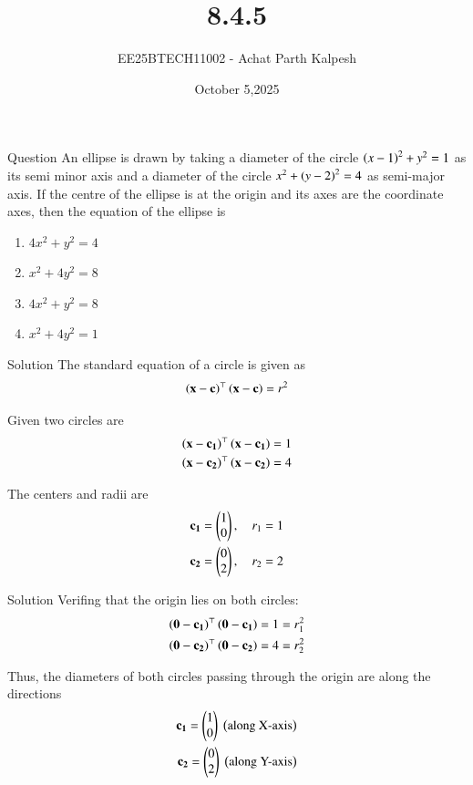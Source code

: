 \documentclass{beamer}
\title %
{8.4.5}
\date{October 5,2025}
\author %
{EE25BTECH11002 - Achat Parth Kalpesh}
\begin{document}
\frame{\titlepage}

\begin{frame}{Question}
An ellipse is drawn by taking a diameter of the circle $\left(x-1\right)^2+y^2=1$ as its semi minor axis and a diameter of the circle $x^2+\left(y-2\right)^2=4$ as semi-major axis. If the centre of the ellipse is at the origin and its axes are the coordinate axes, then the equation of the ellipse is 
\begin{multicols}{2}
\begin{enumerate}
    \item $4x^2+y^2=4$ 
    \item $x^2+4y^2=8$
    \item $4x^2+y^2=8$
    \item $x^2+4y^2=1$
\end{enumerate}
\end{multicols}
\end{frame}

\begin{frame}{Solution}
The standard equation of a circle is given as
\begin{align}
    \left(\mathbf{x}-\mathbf{c}\right)^\top\left(\mathbf{x}-\mathbf{c}\right) = r^2
\end{align}

Given two circles are
\begin{align}
    \left(\mathbf{x}-\mathbf{c_1}\right)^\top\left(\mathbf{x}-\mathbf{c_1}\right) = 1\\
    \left(\mathbf{x}-\mathbf{c_2}\right)^\top\left(\mathbf{x}-\mathbf{c_2}\right) = 4
\end{align}

The centers and radii are
\begin{align}
    \mathbf{c_1} = \begin{pmatrix}1\\0\end{pmatrix}, \quad r_1 = 1\\
    \mathbf{c_2} = \begin{pmatrix}0\\2\end{pmatrix}, \quad r_2 = 2
\end{align}
\end{frame}



\begin{frame}{Solution}
Verifing that the origin lies on both circles:
\begin{align}
    \left(\mathbf{0}-\mathbf{c_1}\right)^\top\left(\mathbf{0}-\mathbf{c_1}\right) = 1 = r_1^2\\
    \left(\mathbf{0}-\mathbf{c_2}\right)^\top\left(\mathbf{0}-\mathbf{c_2}\right) = 4 = r_2^2
\end{align}

Thus, the diameters of both circles passing through the origin are along the directions
\begin{align}
    \mathbf{c_1} = \begin{pmatrix}1\\0\end{pmatrix} \text{ \ensuremath{\left(\text{along X-axis}\right)}}\\
    \mathbf{c_2} = \begin{pmatrix}0\\2\end{pmatrix} \text{ \ensuremath{\left(\text{along Y-axis}\right)}}
\end{align}
\end{frame}
\end{document}
